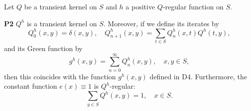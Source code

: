 Let $Q$ be a transient kernel on $S$ and $h$ a positive $Q$-regular function on $S$.

\textbf{P2} $Q^h$ is a transient kernel on $S$. Moreover, if we define its iterates by
$$Q_0^h(x,y) = \delta(x,y), \quad Q_{n+1}^h(x,y) = \sum_{t \in S} Q_n^h(x,t)Q^h(t,y),$$
and its Green function by
$$g^h(x,y) = \sum_{n=0}^{\infty} Q_n^h(x,y), \quad x,y \in S,$$
then this coincides with the function $g^h(x,y)$ defined in D4. Furthermore, the constant function $e(x) \equiv 1$ is $Q^h$-regular:
$$\sum_{y \in S} Q^h(x,y) = 1, \quad x \in S.$$
